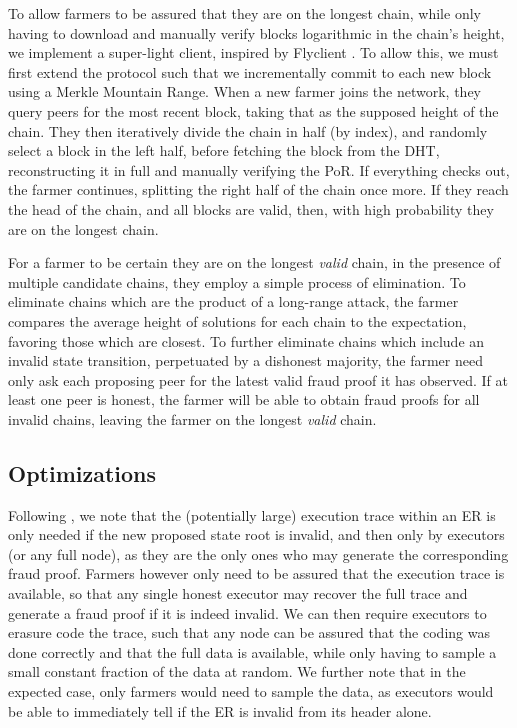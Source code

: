 \documentclass[conference]{IEEEtran}
\begin{document}
To allow farmers to be assured that they are on the longest chain, while only having to download and manually verify blocks logarithmic in the chain’s height, we implement a super-light client, inspired by Flyclient \cite{bunz2020flyclient}. To allow this, we must first extend the protocol such that we incrementally commit to each new block using a Merkle Mountain Range. When a new farmer joins the network, they query peers for the most recent block, taking that as the supposed height of the chain. They then iteratively divide the chain in half (by index), and randomly select a block in the left half, before fetching the block from the DHT, reconstructing it in full and manually verifying the PoR. If everything checks out, the farmer continues, splitting the right half of the chain once more. If they reach the head of the chain, and all blocks are valid, then, with high probability they are on the longest chain. 

For a farmer to be certain they are on the longest \textit{valid} chain, in the presence of multiple candidate chains, they employ a simple process of elimination. To eliminate chains which are the product of a long-range attack, the farmer compares the average height of solutions for each chain to the expectation, favoring those which are closest. To further eliminate chains which include an invalid state transition, perpetuated by a dishonest majority, the farmer need only ask each proposing peer for the latest valid fraud proof it has observed. If at least one peer is honest, the farmer will be able to obtain fraud proofs for all invalid chains, leaving the farmer on the longest \textit{valid} chain. 

\subsection{Optimizations}

Following \cite{al2018fraud}, we note that the (potentially large) execution trace within an ER is only needed if the new proposed state root is invalid, and then only by executors (or any full node), as they are the only ones who may generate the corresponding fraud proof. Farmers however only need to be assured that the execution trace is available, so that any single honest executor may recover the full trace and generate a fraud proof if it is indeed invalid. We can then require executors to erasure code the trace, such that any node can be assured that the coding was done correctly and that the full data is available, while only having to sample a small constant fraction of the data at random. We further note that in the expected case, only farmers would need to sample the data, as executors would be able to immediately tell if the ER is invalid from its header alone. 
\end{document}
